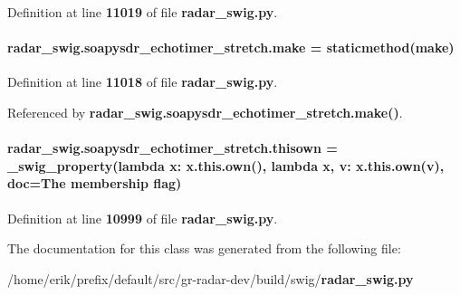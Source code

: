 Definition at line {\bf 11019} of file {\bf radar\+\_\+swig.\+py}.

\paragraph[{make}]{\setlength{\rightskip}{0pt plus 5cm}radar\+\_\+swig.\+soapysdr\+\_\+echotimer\+\_\+stretch.\+make = staticmethod(make)\hspace{0.3cm}{\ttfamily [static]}}\label{classradar__swig_1_1soapysdr__echotimer__stretch_a1567cd16a11c7e48e5bcbccab1fbc53c}


Definition at line {\bf 11018} of file {\bf radar\+\_\+swig.\+py}.



Referenced by {\bf radar\+\_\+swig.\+soapysdr\+\_\+echotimer\+\_\+stretch.\+make()}.

\paragraph[{thisown}]{\setlength{\rightskip}{0pt plus 5cm}radar\+\_\+swig.\+soapysdr\+\_\+echotimer\+\_\+stretch.\+thisown = {\bf \+\_\+swig\+\_\+property}(lambda x\+: x.\+this.\+own(), lambda {\bf x}, v\+: x.\+this.\+own(v), doc=\textquotesingle{}The membership flag\textquotesingle{})\hspace{0.3cm}{\ttfamily [static]}}\label{classradar__swig_1_1soapysdr__echotimer__stretch_a03a67368b828545a1cdb1ad561a5c338}


Definition at line {\bf 10999} of file {\bf radar\+\_\+swig.\+py}.



The documentation for this class was generated from the following file\+:\begin{DoxyCompactItemize}
\item 
/home/erik/prefix/default/src/gr-\/radar-\/dev/build/swig/{\bf radar\+\_\+swig.\+py}\end{DoxyCompactItemize}
